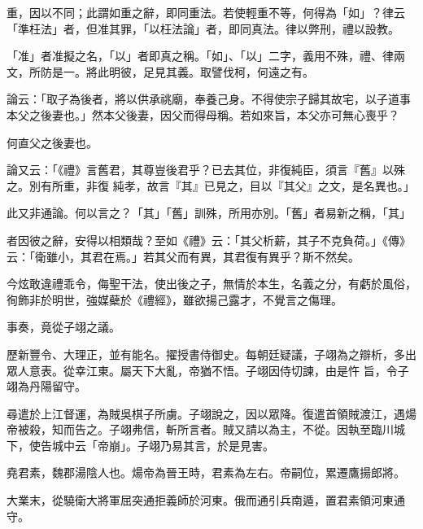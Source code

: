\begin{pinyinscope}
 重，因以不同；此謂如重之辭，即同重法。若使輕重不等，何得為「如」？律云「準枉法」者，但准其罪，「以枉法論」者，即同真法。律以弊刑，禮以設教。



 「准」者准擬之名，「以」者即真之稱。「如」、「以」二字，義用不殊，禮、律兩文，所防是一。將此明彼，足見其義。取譬伐柯，何遠之有。



 論云：「取子為後者，將以供承祧廟，奉養己身。不得使宗子歸其故宅，以子道事本父之後妻也。」然本父後妻，因父而得母稱。若如來旨，本父亦可無心喪乎？



 何直父之後妻也。



 論又云：「《禮》言舊君，其尊豈後君乎？已去其位，非復純臣，須言『舊』以殊之。別有所重，非復
 純孝，故言『其』已見之，目以『其父』之文，是名異也。」



 此又非通論。何以言之？「其」「舊」訓殊，所用亦別。「舊」者易新之稱，「其」



 者因彼之辭，安得以相類哉？至如《禮》云：「其父析薪，其子不克負荷。」《傳》云：「衛雖小，其君在焉。」若其父而有異，其君復有異乎？斯不然矣。



 今炫敢違禮乖令，侮聖干法，使出後之子，無情於本生，名義之分，有虧於風俗，徇飾非於明世，強媒蘗於《禮經》，雖欲揚己露才，不覺言之傷理。



 事奏，竟從子翊之議。



 歷新豐令、大理正，並有能名。擢授書侍御史。每朝廷疑議，子翊為之辯析，多出眾人意表。從幸江東。屬天下大亂，帝猶不悟。子翊因侍切諫，由是忤
 旨，令子翊為丹陽留守。



 尋遣於上江督運，為賊吳棋子所虜。子翊說之，因以眾降。復遣首領賊渡江，遇煬帝被殺，知而告之。子翊弗信，斬所言者。賊又請以為主，不從。因執至臨川城下，使告城中云「帝崩」。子翊乃易其言，於是見害。



 堯君素，魏郡湯陰人也。煬帝為晉王時，君素為左右。帝嗣位，累遷鷹揚郎將。



 大業末，從驍衛大將軍屈突通拒義師於河東。俄而通引兵南遁，置君素領河東通守。




\end{pinyinscope}
